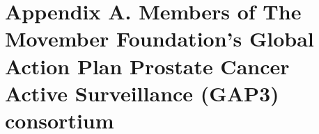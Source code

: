 \documentclass[review, 12pt]{elsarticle}
\begin{document}
\linenumbers










\section*{Appendix A. Members of The Movember Foundation’s Global Action Plan Prostate Cancer Active Surveillance (GAP3) consortium}



\end{document}
